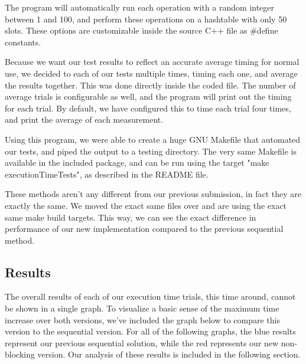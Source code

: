 \documentclass[journal]{IEEEtran}
\begin{document}
The program will automatically run each operation with a random integer between 1 and 100, and perform these operations on a hashtable with only 50 slots. These options are customizable inside the source C++ file as \#define constants.

Because we want our test results to reflect an accurate average timing for normal use, we decided to each of our tests multiple times, timing each one, and average the results together. This was done directly inside the coded file. The number of average trials is configurable as well, and the program will print out the timing for each trial. By default, we have configured this to time each trial four times, and print the average of each measurement.

Using this program, we were able to create a huge GNU Makefile that automated our tests, and piped the output to a testing directory. The very same Makefile is available in the included package, and can be run using the target "make executionTimeTests", as described in the README file.

These methods aren't any different from our previous submission, in fact they are exactly the same. We moved the exact same files over and are using the exact same make build targets. This way, we can see the exact difference in performance of our new implementation compared to the previous sequential method.

\subsection{Results}

The overall results of each of our execution time trials, this time around, cannot be shown in a single graph. To visualize a basic sense of the maximum time increase over both versions, we've included the graph below to compare this version to the sequential version. For all of the following graphs, the blue results represent our previous sequential solution, while the red represents our new non-blocking version. Our analysis of these results is included in the following section.
\end{document}
